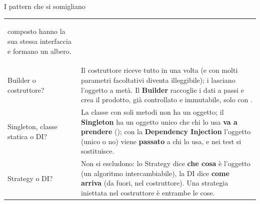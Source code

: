 \begin{guida}{{\badge[pcolore]{\thevoce}\enspace I pattern che si somigliano}}
\begin{tabular}{@{}>{\bfseries\raggedright\arraybackslash}p{3.2cm} P{14.4cm}@{}}
    composto hanno la sua stessa interfaccia e formano un albero. \\
  Builder o costruttore? & Il costruttore riceve tutto in una volta (e con molti parametri facoltativi diventa
    illeggibile); i  lasciano l'oggetto a metà. Il \textbf{Builder} raccoglie i dati a passi e crea il
    prodotto, già controllato e immutabile, solo con . \\
  Singleton, classe statica o DI? & La classe con soli metodi  non ha un oggetto; il
    \textbf{Singleton} ha un oggetto unico che chi lo usa \textbf{va a prendere} (); con la
    \textbf{Dependency Injection} l'oggetto (unico o no) viene \textbf{passato} a chi lo usa, e nei test si
    sostituisce. \\
  Strategy o DI? & Non si escludono: lo Strategy dice \textbf{che cosa} è l'oggetto (un algoritmo intercambiabile),
    la DI dice \textbf{come arriva} (da fuori, nel costruttore). Una strategia iniettata nel costruttore è entrambe
    le cose. \\
\end{tabular}
\end{guida}


